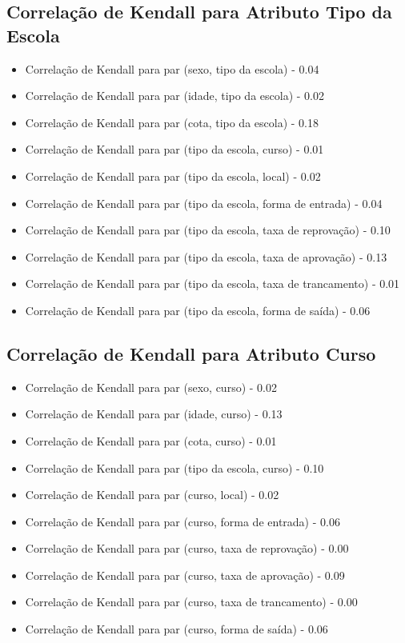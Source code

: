 \subsection{Correlação de Kendall para Atributo Tipo da Escola}
\begin{itemize}
    \item Correlação de Kendall para par (sexo, tipo da escola) - 0.04
    \item Correlação de Kendall para par (idade, tipo da escola) - 0.02
    \item Correlação de Kendall para par (cota, tipo da escola) - 0.18
    \item Correlação de Kendall para par (tipo da escola, curso) - 0.01
    \item Correlação de Kendall para par (tipo da escola, local) - 0.02
    \item Correlação de Kendall para par (tipo da escola, forma de entrada) - 0.04
    \item Correlação de Kendall para par (tipo da escola, taxa de reprovação) - 0.10
    \item Correlação de Kendall para par (tipo da escola, taxa de aprovação) - 0.13
    \item Correlação de Kendall para par (tipo da escola, taxa de trancamento) - 0.01
    \item Correlação de Kendall para par (tipo da escola, forma de saída) - 0.06
\end{itemize}

\subsection{Correlação de Kendall para Atributo Curso}
\begin{itemize}
    \item Correlação de Kendall para par (sexo, curso) - 0.02
    \item Correlação de Kendall para par (idade, curso) - 0.13
    \item Correlação de Kendall para par (cota, curso) - 0.01
    \item Correlação de Kendall para par (tipo da escola, curso) - 0.10
    \item Correlação de Kendall para par (curso, local) - 0.02
    \item Correlação de Kendall para par (curso, forma de entrada) - 0.06
    \item Correlação de Kendall para par (curso, taxa de reprovação) - 0.00
    \item Correlação de Kendall para par (curso, taxa de aprovação) - 0.09
    \item Correlação de Kendall para par (curso, taxa de trancamento) - 0.00
    \item Correlação de Kendall para par (curso, forma de saída) - 0.06
\end{itemize}

